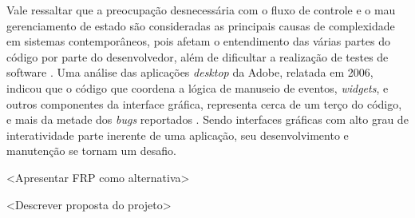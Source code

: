 Vale ressaltar que a preocupação desnecessária com o
fluxo de controle e o mau gerenciamento de estado são
consideradas as principais causas de complexidade em
sistemas contemporâneos, pois afetam o entendimento das
várias partes do código por parte do desenvolvedor,
além de dificultar a realização de testes de software
\cite{Moseley06outof}.
Uma análise das aplicações \textit{desktop} da Adobe,
relatada em 2006, indicou que o código que coordena a
lógica de manuseio de eventos, \textit{widgets}, e outros
componentes da interface gráfica, representa cerca de
um terço do código, e mais da metade dos \textit{bugs}
reportados \cite{jarvi2008property}.
Sendo interfaces gráficas com alto grau de interatividade
parte inerente de uma aplicação, seu desenvolvimento e
manutenção se tornam um desafio.


%

<Apresentar FRP como alternativa>


<Descrever proposta do projeto>
